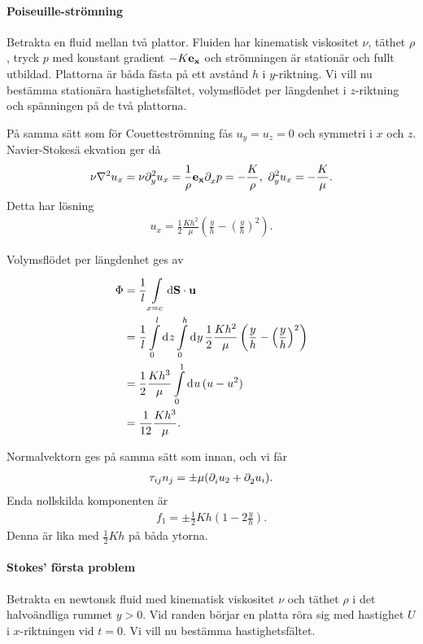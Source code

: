 \paragraph{Poiseuille-strömning}
Betrakta en fluid mellan två plattor. Fluiden har kinematisk viskositet $\nu$, täthet $\rho$, tryck $p$ med konstant gradient $-K\vb{e}_{\vb{x}}$ och strömningen är stationär och fullt utbildad. Plattorna är båda fästa på ett avstånd $h$ i $y$-riktning. Vi vill nu bestämma stationära hastighetsfältet, volymsflödet per längdenhet i $z$-riktning och spänningen på de två plattorna.

På samma sätt som för Couetteströmning fås $u_{y} = u_{z} = 0$ och symmetri i $x$ och $z$. Navier-Stokesä ekvation ger då
\begin{align*}
	\nu\laplacian{u_{x}} = \nu\del[2]{y}{u_{x}} = \frac{1}{\rho}\ub{x}\del{x}{p} = -\frac{K}{\rho},\ \del[2]{y}{u_{x}} = -\frac{K}{\mu}.
\end{align*}
Detta har lösning
\begin{align*}
	u_{x} = \frac{1}{2}\frac{Kh^{2}}{\mu}\left(\frac{y}{h} - \left(\frac{y}{h}\right)^{2}\right).
\end{align*}

Volymsflödet per längdenhet ges av
\begin{align*}
	\Phi &= \frac{1}{l}\int\limits_{x = c}^{}\dd{\vb{S}}\cdot \vb{u} \\
	     &= \frac{1}{l}\int\limits_{0}^{l}\dd[]{z}\int\limits_{0}^{h}\dd[]{y}\frac{1}{2}\frac{Kh^{2}}{\mu}\left(\frac{y}{h} - \left(\frac{y}{h}\right)^{2}\right) \\
	     &= \frac{1}{2}\frac{Kh^{3}}{\mu}\int\limits_{0}^{1}\dd[]{u}(u - u^{2}) \\
	     &= \frac{1}{12}\frac{Kh^{3}}{\mu}.
\end{align*}

Normalvektorn ges på samma sätt som innan, och vi får
\begin{align*}
	\tau_{ij}n_{j} = \pm\mu(\partial_{i}^{}u_{2} + \partial_{2}^{}u_{i}).
\end{align*}
Enda nollskilda komponenten är
\begin{align*}
	f_{1} = \pm\frac{1}{2}Kh\left(1 - 2\frac{y}{h}\right).
\end{align*}
Denna är lika med $\frac{1}{2}Kh$ på båda ytorna.

\paragraph{Stokes' första problem}
Betrakta en newtonsk fluid med kinematisk viskositet $\nu$ och täthet $\rho$ i det halvoändliga rummet $y > 0$. Vid randen börjar en platta röra sig med hastighet $U$ i $x$-riktningen vid $t = 0$. Vi vill nu bestämma hastighetsfältet.

